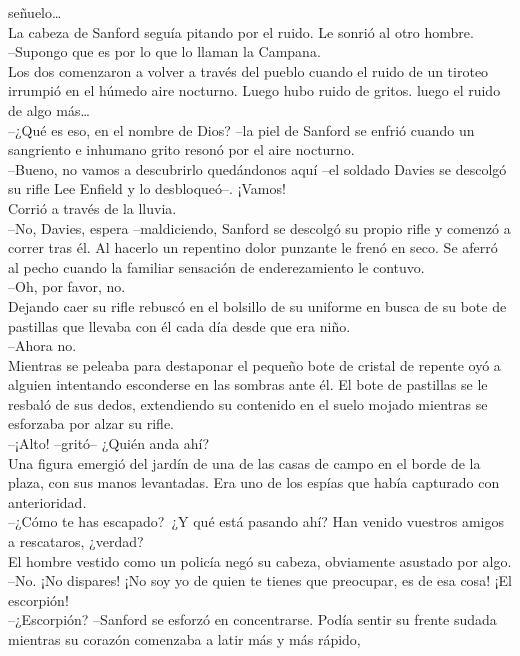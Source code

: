 señuelo\ldots{}\\
La cabeza de Sanford seguía pitando por el ruido. Le sonrió al otro
hombre.\\
--Supongo que es por lo que lo llaman la Campana.\\
Los dos comenzaron a volver a través del pueblo cuando el ruido de un
tiroteo irrumpió en el húmedo aire nocturno. Luego hubo ruido de gritos.
luego el ruido de algo más\ldots{}\\
--¿Qué es eso, en el nombre de Dios? --la piel de Sanford se enfrió
cuando un sangriento e inhumano grito resonó por el aire nocturno.\\
--Bueno, no vamos a descubrirlo quedándonos aquí --el soldado Davies se
descolgó su rifle Lee Enfield y lo desbloqueó--. ¡Vamos!\\
Corrió a través de la lluvia.\\
--No, Davies, espera --maldiciendo, Sanford se descolgó su propio rifle
y comenzó a correr tras él. Al hacerlo un repentino dolor punzante le
frenó en seco. Se aferró al pecho cuando la familiar sensación de
enderezamiento le contuvo.\\
--Oh, por favor, no.\\
Dejando caer su rifle rebuscó en el bolsillo de su uniforme en busca de
su bote de pastillas que llevaba con él cada día desde que era niño.\\
--Ahora no.\\
Mientras se peleaba para destaponar el pequeño bote de cristal de
repente oyó a alguien intentando esconderse en las sombras ante él. El
bote de pastillas se le resbaló de sus dedos, extendiendo su contenido
en el suelo mojado mientras se esforzaba por alzar su rifle.\\
--¡Alto! --gritó-- ¿Quién anda ahí?\\
Una figura emergió del jardín de una de las casas de campo en el borde
de la plaza, con sus manos levantadas. Era uno de los espías que había
capturado con anterioridad.\\
--¿Cómo te has escapado?~¿Y qué está pasando ahí? Han venido vuestros
amigos a rescataros, ¿verdad?\\
El hombre vestido como un policía negó su cabeza, obviamente asustado
por algo.\\
--No. ¡No dispares! ¡No soy yo de quien te tienes que preocupar, es de
esa cosa! ¡El escorpión!\\
--¿Escorpión? --Sanford se esforzó en concentrarse. Podía sentir su
frente sudada mientras su corazón comenzaba a latir más y más rápido,

